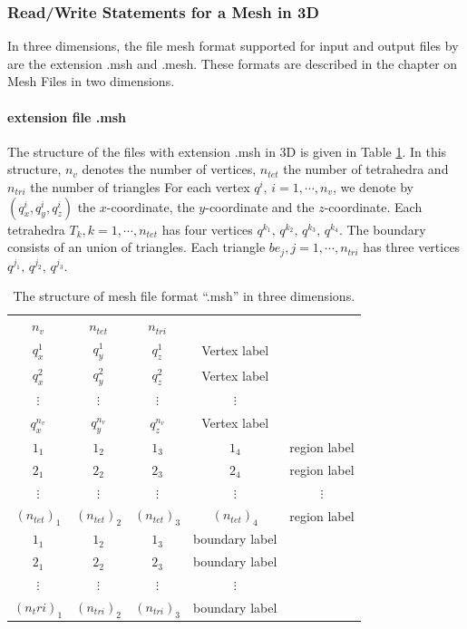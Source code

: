 \documentclass[a4paper,twoside,12pt]{book}
\begin{document}
\subsubsection{Read/Write Statements for a Mesh in 3D}

In three dimensions, the file mesh format supported for input and output files by \freefempp are the extension .msh and .mesh.
These formats are described in the chapter on Mesh Files in two dimensions.

\paragraph{extension file .msh}
The structure of the files with extension .msh in 3D is given in Table \ref{tab:mesh3DSample}.
In this structure, $n_v$ denotes the number of vertices, $n_{tet}$ the number of tetrahedra and $n_{tri}$ the number of triangles
For each vertex $q^i,\, i=1,\cdots,n_v$, we denote by $(q^i_x,q^i_y,q^i_z)$ the $x$-coordinate, the $y$-coordinate and the $z$-coordinate.
Each tetrahedra $T_k, k=1,\cdots,n_{tet}$ has four vertices $q^{k_1},\, q^{k_2},\,q^{k_3}, \,q^{k_4}$.
The boundary consists of an union of triangles. Each triangle $be_j, j=1,\cdots,n_{tri}$ has three vertices $q^{j_1},\, q^{j_2},\,q^{j_3}$.

\begin{table}[htbp]
\hspace*{3cm}
\begin{tabular}{|ccccc|}
\hline
$n_v$&  $n_{tet}$& $n_{tri}$ & &\\
$q^1_x$& $q^1_y$& $q^1_z$ & Vertex label &\\
$q^2_x$& $q^2_y$&  $q^2_z$ & Vertex label &\\
$\vdots$  &$\vdots$ &$\vdots$ &$\vdots$ &\\
$q^{n_v}_x$& $q^{n_v}_y$&  $q^{n_v}_z$ & Vertex label&\\
$1_1$& $1_2$& $1_3$& $1_4$ & region label \\
$2_1$& $2_2$& $2_3$& $2_4$ & region label  \\
$\vdots$  &$\vdots$ &$\vdots$ &$\vdots$  &$\vdots$ \\
$(n_{tet})_1$& $(n_{tet})_2$& $(n_{tet})_3  $& $(n_{tet})_4$ & region label \\
$1_1$ & $1_2$& $1_3$& boundary label & \\
$2_1$ & $2_2$& $2_3$& boundary label & \\
$\vdots$&  $\vdots$ &$\vdots$ &$\vdots$ &\\
$(n_tri)_{1}$ & $(n_{tri})_2$& $(n_{tri})_3$ & boundary label &\\
\hline
\end{tabular}
 \caption{The structure of mesh file format ``.msh'' in three dimensions.}
\label{tab:mesh3DSample}
\end{table}
\end{document}
